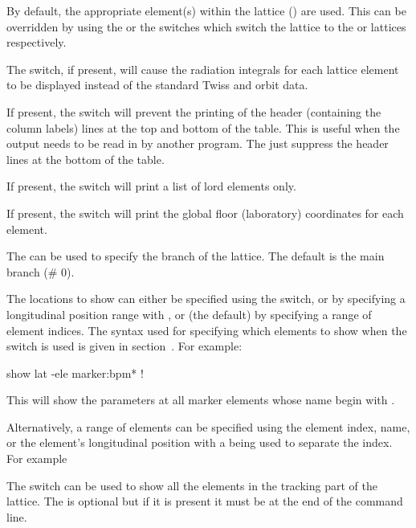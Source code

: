 {{{\begin{description}
By default, the appropriate element(s) within the  lattice
() are used. This can be overridden by using the
 or the  switches which switch the lattice to
the  or  lattices respectively.

The  switch, if present, will cause the
radiation integrals for each lattice element to be displayed instead
of the standard Twiss and orbit data.

If present, the  switch will prevent the printing
of the header (containing the column labels) lines at the top and
bottom of the table.  This is useful when the output needs to be read
in by another program. The  just suppress the header
lines at the bottom of the table.

If present, the  switch will print a list of lord elements only.

If present, the  switch will print the global floor
(laboratory) coordinates for each element.

The  can be used to specify the branch of the lattice.
The default is the main branch (\# 0).

The locations to show can either be specified using the 
switch, or by specifying a longitudinal position range with ,
or (the default) by specifying a range of element indices.  The syntax
used for specifying which elements to show when the 
 switch is used is given in section~. 
For example:
\begin{example}
  show lat -ele marker:bpm*   !
\end{example}
This will show the parameters at all marker elements whose name begin
with . 

Alternatively, a range of elements can be specified using the element
index, name, or the element's longitudinal position with a  being
used to separate the index. For example
The  switch can be used to show all the elements
in the tracking part of the lattice. The
 is optional but if it is present it must be at the
end of the command line.


\end{description}}}}
